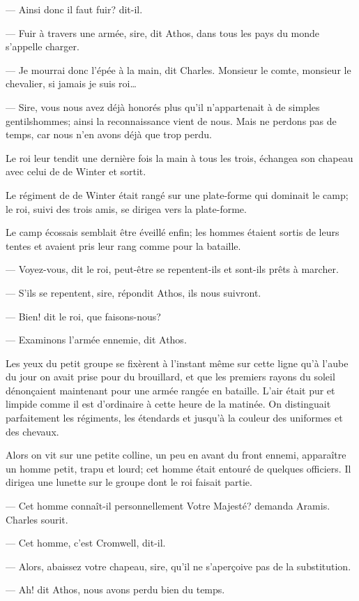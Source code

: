 — Ainsi donc il faut fuir? dit-il.

— Fuir à travers une armée, sire, dit Athos, dans tous les pays du monde s'appelle charger.

— Je mourrai donc l'épée à la main, dit Charles. Monsieur le comte, monsieur le chevalier, si jamais je suis roi\dots

— Sire, vous nous avez déjà honorés plus qu'il n'appartenait à de simples gentilshommes; ainsi la reconnaissance vient de nous. Mais ne perdons pas de temps, car nous n'en avons déjà que trop perdu.

Le roi leur tendit une dernière fois la main à tous les trois, échangea son chapeau avec celui de de Winter et sortit.

Le régiment de de Winter était rangé sur une plate-forme qui dominait le camp; le roi, suivi des trois amis, se dirigea vers la plate-forme.

Le camp écossais semblait être éveillé enfin; les hommes étaient sortis de leurs tentes et avaient pris leur rang comme pour la bataille.

— Voyez-vous, dit le roi, peut-être se repentent-ils et sont-ils prêts à marcher.

— S'ils se repentent, sire, répondit Athos, ils nous suivront.

— Bien! dit le roi, que faisons-nous?

— Examinons l'armée ennemie, dit Athos.

Les yeux du petit groupe se fixèrent à l'instant même sur cette ligne qu'à l'aube du jour on avait prise pour du brouillard, et que les premiers rayons du soleil dénonçaient maintenant pour une armée rangée en bataille. L'air était pur et limpide comme il est d'ordinaire à cette heure de la matinée. On distinguait parfaitement les régiments, les étendards et jusqu'à la couleur des uniformes et des chevaux.

Alors on vit sur une petite colline, un peu en avant du front ennemi, apparaître un homme petit, trapu et lourd; cet homme était entouré de quelques officiers. Il dirigea une lunette sur le groupe dont le roi faisait partie.

— Cet homme connaît-il personnellement Votre Majesté? demanda Aramis.
Charles sourit.

— Cet homme, c'est Cromwell, dit-il.

— Alors, abaissez votre chapeau, sire, qu'il ne s'aperçoive pas de la substitution.

— Ah! dit Athos, nous avons perdu bien du temps.

